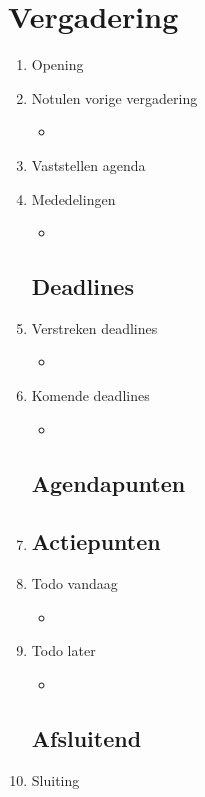 \documentclass{article}
\begin{document}
\section*{Vergadering}
\begin{enumerate}
	
	\subsection*{Vooraf}
	\item Opening
	\item Notulen vorige vergadering
	\begin{itemize}
		\item
	\end{itemize}
	\item Vaststellen agenda
	\item Mededelingen
	\begin{itemize}
		\item
	\end{itemize}

	\subsection*{Deadlines}
	\item Verstreken deadlines
	\begin{itemize}
		\item
	\end{itemize}
	\item Komende deadlines
	\begin{itemize}
		\item
	\end{itemize}

	\subsection*{Agendapunten}
	\item
	

	\subsection*{Actiepunten}
	\item Todo vandaag
	\begin{itemize}
		\item
	\end{itemize}
	\item Todo later
	\begin{itemize}
		\item
	\end{itemize}

	\noindent 
	\subsection*{Afsluitend}
	\item Sluiting

\end{enumerate}
\end{document}

